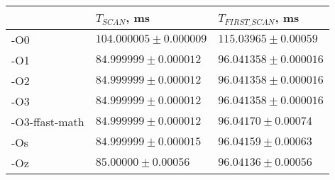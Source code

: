 \begin{tabular}{lll}
\toprule
 & $T_{SCAN}$, ms & $T_{FIRST\_SCAN}$, ms \\
\midrule
-O0 & $104.000005 \pm 0.000009$ & $115.03965 \pm 0.00059$ \\
-O1 & $84.999999 \pm 0.000012$ & $96.041358 \pm 0.000016$ \\
-O2 & $84.999999 \pm 0.000012$ & $96.041358 \pm 0.000016$ \\
-O3 & $84.999999 \pm 0.000012$ & $96.041358 \pm 0.000016$ \\
-O3-ffast-math & $84.999999 \pm 0.000012$ & $96.04170 \pm 0.00074$ \\
-Os & $84.999999 \pm 0.000015$ & $96.04159 \pm 0.00063$ \\
-Oz & $85.00000 \pm 0.00056$ & $96.04136 \pm 0.00056$ \\
\bottomrule
\end{tabular}
